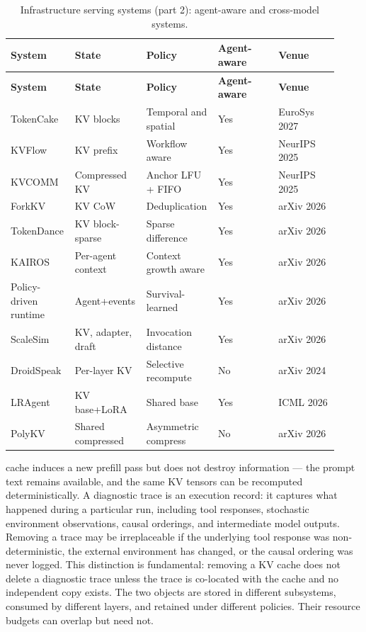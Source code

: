 \documentclass[preprint,12pt]{elsarticle}
\begin{document}
\begin{center}
\begingroup
\setlength{\tabcolsep}{2pt}
\renewcommand{\arraystretch}{1.16}
\footnotesize
\begin{longtable}{|p{0.183\linewidth}|p{0.183\linewidth}|p{0.183\linewidth}|p{0.183\linewidth}|p{0.183\linewidth}|}
\caption{Infrastructure serving systems (part 2): agent-aware and cross-model systems.}\label{tab:v5_5}\\
\hline
\textbf{System} & \textbf{State} & \textbf{Policy} & \textbf{Agent-aware} & \textbf{Venue} \\ \hline
\endfirsthead
\textbf{System} & \textbf{State} & \textbf{Policy} & \textbf{Agent-aware} & \textbf{Venue} \\ \hline
\endhead
TokenCake & KV blocks & Temporal and spatial & Yes & EuroSys 2027 \\ \hline
KVFlow & KV prefix & Workflow aware & Yes & NeurIPS 2025 \\ \hline
KVCOMM & Compressed KV & Anchor LFU + FIFO & Yes & NeurIPS 2025 \\ \hline
ForkKV & KV CoW & Deduplication & Yes & arXiv 2026 \\ \hline
TokenDance\cite{v5supp2} & KV block-sparse & Sparse difference & Yes & arXiv 2026 \\ \hline
KAIROS & Per-agent context & Context growth aware & Yes & arXiv 2026 \\ \hline
Policy-driven runtime & Agent+events & Survival-\allowbreak learned & Yes & arXiv 2026 \\ \hline
ScaleSim & KV, adapter, draft & Invocation distance & Yes & arXiv 2026 \\ \hline
DroidSpeak & Per-layer KV & Selective recompute & No & arXiv 2024 \\ \hline
LRAgent\cite{v5supp4} & KV base+LoRA & Shared base & Yes & ICML 2026 \\ \hline
PolyKV\cite{v5supp5} & Shared compressed & Asymmetric compress & No & arXiv 2026 \\ \hline
\end{longtable}
\endgroup
\end{center}
cache induces a new prefill pass but does not destroy information --- the prompt text remains available, and the same KV tensors can be recomputed deterministically. A diagnostic trace is an execution record: it captures what happened during a particular run, including tool responses, stochastic environment observations, causal orderings, and intermediate model outputs. Removing a trace may be irreplaceable if the underlying tool response was non-deterministic, the external environment has changed, or the causal ordering was never logged. This distinction is fundamental: removing a KV cache does not delete a diagnostic trace unless the trace is co-located with the cache and no independent copy exists. The two objects are stored in different subsystems, consumed by different layers, and retained under different policies. Their resource budgets can overlap but need not.
\end{document}
